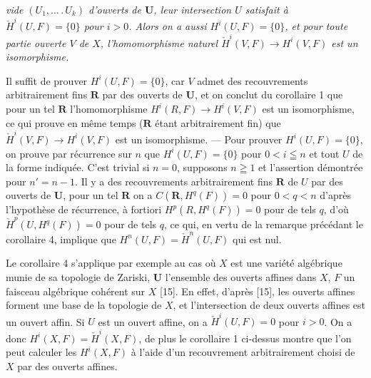 
\noindent\textit{vide $(U_1,\ldots\mathpunct{.}U_k)$ d'ouverts de $\mathbf U$, leur
intersection $U$ satisfait à $\check H^i(U,F)=\{0\}$ pour $i>0$. Alors on a
aussi $H^i(U,F)=\{0\}$, et pour toute partie ouverte $V$ de $X$,
l'homomorphisme naturel $\check H^i(V,F)\to H^i(V,F)$ est un
isomorphisme.}

Il suffit de prouver $H^i(U,F)=\{0\}$, car $V$ admet des recouvrements
arbitrairement fins $\mathbf R$ par des ouverts de $\mathbf U$, et on conclut
du corollaire 1 que pour un tel $\mathbf R$ l'homomorphisme
$H^i(R,F)\to H^i(V,F)$ est un isomorphisme, ce qui prouve
en même temps ($\mathbf R$ étant arbitrairement fin) que
$\check H^i(V,F)\to H^i(V,F)$ est un isomorphisme.
--- Pour prouver $H^i(U,F)=\{0\}$, on prouve par récurrence sur $n$ que
$H^i(U,F)=\{0\}$ pour $0<i\leqq n$ et tout $U$ de la forme indiquée. C'est
trivial si $n=0$, supposons $n\geqq 1$ et l'assertion démontrée pour
$n'=n-1$. Il y a des recouvrements arbitrairement fins $\mathbf R$ de $U$ par
des ouverts de $\mathbf U$, pour un tel $\mathbf R$ on a
$C(\mathbf R,H^q(F))=0$ pour $0<q<n$
d'après l'hypothèse de récurrence, à fortiori
$H^p(R,H^q(F))=0$ pour de tels $q$,
d'où
$\check H^p(U,H^q(F))=0$ pour de tels $q$,
ce qui, en vertu de la remarque précédant le corollaire 4, implique que
$H^n(U,F)=\check H^n(U,F) $
qui est nul.

Le corollaire 4 s'applique par exemple au cas où $X$ est une variété
algébrique munie de sa topologie de Zariski, $\mathbf U$ l'ensemble des
ouverts affines dans $X$, $F$ un faisceau algébrique cohérent sur $X$ [15]. En
effet, d'après [15], les ouverts affines forment une base de la topologie de
$X$, et l'intersection de deux ouverts affines est un ouvert affin. Si $U$
est un ouvert affine, on a $\check H^i(U,F)=0$ pour $i>0$. On a donc
$H^i(X,F)=\check H^i(X,F)$,
de plus le corollaire 1 ci-dessus montre que l'on peut calculer les $H^i(X,F)$
à l'aide d'un recouvrement arbitrairement choisi de $X$ par des ouverts
affines.

